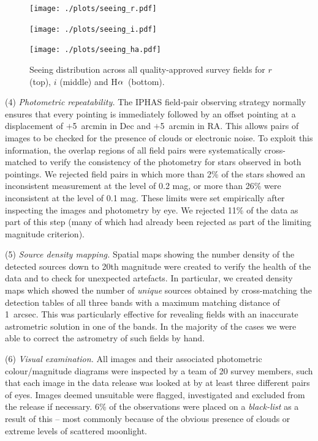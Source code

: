 \documentclass[useAMS,usenatbib]{mn2e}
\def\ha{\mbox{H$\rm \alpha$}}
\begin{document}
\begin{figure}
    \begin{minipage}[b]{\linewidth}
        \texttt{[image: ./plots/seeing\_r.pdf]} 
    \end{minipage}
    \begin{minipage}[b]{\linewidth}
        \texttt{[image: ./plots/seeing\_i.pdf]} 
    \end{minipage}
    \begin{minipage}[b]{\linewidth}
        \texttt{[image: ./plots/seeing\_ha.pdf]} 
    \end{minipage}
    \caption{Seeing distribution across all
             quality-approved survey fields
             for $r$ (top), $i$ (middle) and \ha\ (bottom).}
    \label{fig:seeing}
\end{figure}


(4) \emph{Photometric repeatability.} 
The IPHAS field-pair observing strategy normally
ensures that every pointing is immediately followed 
by an offset pointing at a displacement of $+$5~arcmin in Dec 
and $+$5~arcmin in RA.
This allows pairs of images to be checked 
for the presence of clouds or electronic noise.
To exploit this information,
the overlap regions of all field pairs were systematically cross-matched
to verify the consistency of the photometry
for stars observed in both pointings.
We rejected field pairs in which more than 2\% of the stars 
showed an inconsistent measurement at the level of 0.2 mag,
or more than 26\% were inconsistent at the level of 0.1 mag.
These limits were set empirically after inspecting
the images and photometry by eye.
We rejected 11\% of the data as part of this step
(many of which had already been rejected as part of the limiting magnitude criterion).

(5) \emph{Source density mapping.}
Spatial maps showing the number density of the detected sources
down to 20th magnitude were created to verify the health
of the data and to check for unexpected artefacts.
In particular, we created density maps
which showed the number of \emph{unique} sources
obtained by cross-matching the detection tables of
all three bands with a maximum matching distance of 1~arcsec.
This was particularly effective for revealing
fields with an inaccurate astrometric solution in one of the bands.
In the majority of the cases we were able to correct the astrometry
of such fields by hand.  

(6) \emph{Visual examination.}
All images and their associated photometric colour/magnitude diagrams
were inspected by a team of 20 survey members, 
such that each image in the data release 
was looked at by at least three different pairs of eyes.
Images deemed unsuitable were flagged, investigated and
excluded from the release if necessary. 
6\% of the observations were placed on a \emph{black-list}
as a result of this -- most commonly because of the obvious 
presence of clouds or extreme levels of scattered moonlight.
\end{document}
